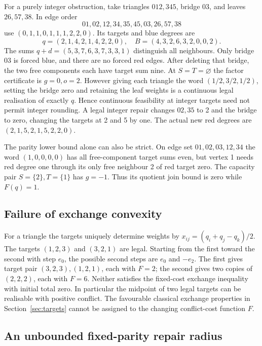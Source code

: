 For a purely integer obstruction, take triangles $012,345$, bridge
$03$, and leaves $26,57,38$. In edge order
\[
 01,02,12,34,35,45,03,26,57,38
\]
use $(0,1,1,0,1,1,1,2,2,0)$. Its targets and blue degrees are
\[
 q=(2,1,4,2,1,4,2,2,0),\quad B=(4,3,2,6,3,2,0,0,2).
\]
The sums $q+d=(5,3,7,6,3,7,3,3,1)$ distinguish all neighbours.
Only bridge $03$ is forced blue, and there are no forced red edges.
After deleting that bridge, the two free components each have target
sum nine. At $S=T=\varnothing$ the factor certificate is
$g=0,o=2$. However giving each triangle the word
$(1/2,3/2,1/2)$, setting the bridge zero and retaining the leaf
weights is a continuous legal realisation of exactly $q$. Hence
continuous feasibility at integer targets need not permit integer
rounding. A legal integer repair changes $02,35$ to 2 and the
bridge to zero, changing the targets at 2 and 5 by one. The actual
new red degrees are $(2,1,5,2,1,5,2,2,0)$.

The parity lower bound alone can also be strict. On edge set
$01,02,03,12,34$ the word $(1,0,0,0,0)$ has all free-component
target sums even, but vertex 1 needs red degree one through its
only free neighbour 2 of red target zero. The capacity pair
$S=\{2\},T=\{1\}$ has $g=-1$. Thus its quotient join bound is
zero while $F(q)=1$.

\subsection{Failure of exchange convexity}

For a triangle the targets uniquely determine weights by
$x_{ij}=(q_i+q_j-q_k)/2$. The targets $(1,2,3)$ and $(3,2,1)$
are legal. Starting from the first toward the second with step
$e_0$, the possible second steps are $e_0$ and $-e_2$.
The first gives target pair $(3,2,3),(1,2,1)$, each with $F=2$;
the second gives two copies of $(2,2,2)$, each with $F=6$.
Neither satisfies the fixed-cost exchange inequality with initial
total zero. In particular the midpoint of two legal targets can
be realisable with positive conflict. The favourable classical
exchange properties in Section~\ref{sec:targets} cannot be assigned
to the changing conflict-cost function $F$.

\subsection{An unbounded fixed-parity repair radius}\label{sec:radius}

